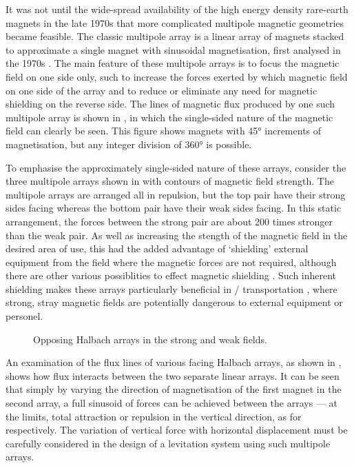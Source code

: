 \documentclass[11pt,a4paper]{memoir}
\begin{document}
It was not until the wide-spread availability of the high energy density rare-earth magnets in the late 1970s that more complicated multipole magnetic geometries became feasible.
The classic multipole array is a linear array of magnets stacked to approximate a single magnet with sinusoidal magnetisation, first analysed in the 1970s \parencite{halbach1981,shute2000-ietm}.
The main feature of these multipole arrays is to focus the magnetic field on one side only, such to increase the forces exerted by which magnetic field on one side of the array and to reduce or eliminate any need for magnetic shielding on the reverse side.
The lines of magnetic flux produced by one such multipole array is shown in , in which the single-sided nature of the magnetic field can clearly be seen.
This figure shows magnets with \ang{45} increments of magnetisation, but any integer division of \ang{360} is possible.

To emphasise the approximately single-sided nature of these arrays, consider the three multipole arrays shown in  with contours of magnetic field strength.
The multipole arrays are arranged all in repulsion, but the top pair have their strong sides facing whereas the bottom pair have their weak sides facing.
In this static arrangement, the forces between the strong pair are about 200 times stronger than the weak pair.
As well as increasing the stength of the magnetic field in the desired area of use, this had the added advantage of `shielding' external equipment from the field where the magnetic forces are not required, although there are other various possiblities to effect magnetic shielding \cite{becherini2009}.
Such inherent shielding makes these arrays particularly beneficial in \maglev/ transportation \cite{hoburg2004}, where strong, stray magnetic fields are potentially dangerous to external equipment or personel.

\begin{figure}
   \centering
   \caption{Opposing Halbach arrays in the strong and weak fields.}
\end{figure}

An examination of the flux lines of various facing Halbach arrays, as shown in , shows how flux interacts between the two separate linear arrays.
It can be seen that simply by varying the direction of magnetisation of the first magnet in the second array, a full sinusoid of forces can be achieved between the arrays — at the limits, total
attraction or repulsion in the vertical direction, as for  respectively.
The variation of vertical force with horizontal displacement must be carefully considered in the design of a levitation system using such multipole arrays.
\end{document}
